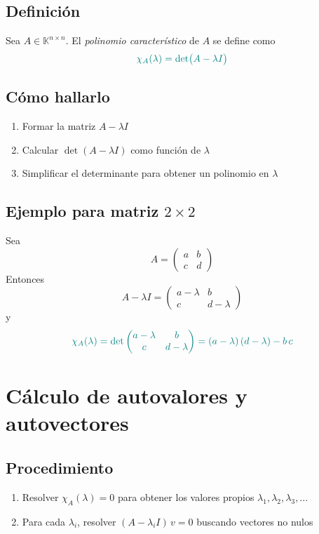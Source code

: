 \documentclass{article}
\begin{document}
\subsection*{Definición}
Sea \(A\in\mathbb{K}^{n\times n}\). El \emph{polinomio característico} de \(A\) se define como
\[ \color{teal}
\chi_A(\lambda)=\det\bigl(A - \lambda I\bigr)
\]

\subsection*{Cómo hallarlo}
\begin{enumerate}
  \item Formar la matriz \(A - \lambda I\)
  \item Calcular \(\det(A - \lambda I)\) como función de \(\lambda\)
  \item Simplificar el determinante para obtener un polinomio en \(\lambda\)
\end{enumerate}

\subsection*{Ejemplo para matriz \(2\times2\)}
Sea
\[
A = \begin{pmatrix}
 a & b\\
 c & d
\end{pmatrix}
\]
Entonces
\[
A - \lambda I = \begin{pmatrix}
 a - \lambda & b\\
 c & d - \lambda
\end{pmatrix}
\]
y
\[\color{teal}
\chi_A(\lambda)
= \det\begin{pmatrix}
 a - \lambda & b\\
 c & d - \lambda
\end{pmatrix}
= (a - \lambda)\,(d - \lambda) - b\,c
\]

\section*{Cálculo de autovalores y autovectores}

\subsection*{Procedimiento}
\begin{enumerate}
  \item Resolver \(\chi_A(\lambda)=0\) para obtener los valores propios \(\lambda_1,\lambda_2, \lambda_3,...\)
  \item Para cada \(\lambda_i\), resolver
  \( (A - \lambda_i I)\,v = 0 \)
  buscando vectores no nulos
\end{enumerate}
\end{document}
